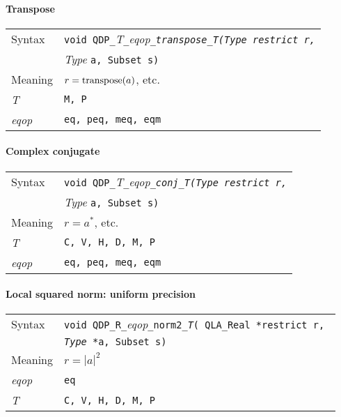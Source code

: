 \documentclass{article}
\newcommand{\tqlaReal}{QLA\ttdash Real }
\newcommand{\namespace}{QDP}
\newcommand{\allEqOps}{{\tt eq, peq, meq, eqm}}
\newcommand{\allComplexTypes}{{\tt C, V, H, D, M, P}}
\newcommand{\ttdash}{{\tt \_}}
\newcommand{\itt}{\it T}
\newcommand{\extraarg}{, Subset s}
\newcommand{\protoUnarySingleTypesQual}[5]{{\tt void \namespace}\ttdash{\tt #1}\ttdash{\it eqop}\ttdash#2\ttdash{\tt #3}{\tt ( #4 *restrict r, }\\
  & {\tt #5 *a\extraarg)}}
\newcommand{\protoUnaryQual}[1]{{\tt void \namespace}\ttdash\itt\ttdash{\it eqop}\ttdash#1\ttdash\itt{\tt (}{\it Type }{\tt *restrict r,}\\
 & {\it Type }{\tt *a\extraarg)}}
\begin{document}
\paragraph{Transpose}

\begin{flushleft}
  \begin{tabular}{|l|l|}
  \hline
  Syntax      & \protoUnaryQual{\tt transpose}  \\
  \hline
  Meaning     & $r = {\rm transpose}(a)$, etc. \\
  \hline
  \itt     & {\tt M, P} \\
  \hline
  {\it eqop}  & \allEqOps \\
  \hline
  \end{tabular}
\end{flushleft}

\paragraph{Complex conjugate}

\begin{flushleft}
  \begin{tabular}{|l|l|}
  \hline
  Syntax      & \protoUnaryQual{\tt conj}  \\
  \hline
  Meaning     & $r = a^*$, etc. \\
  \hline
  \itt     & {\tt C, V, H, D, M, P} \\
  \hline
  {\it eqop}  & \allEqOps \\
  \hline
  \end{tabular}
\end{flushleft}

\paragraph{Local squared norm: uniform precision}

\begin{flushleft}
  \begin{tabular}{|l|l|}
  \hline
  Syntax      & \protoUnarySingleTypesQual{R}{\tt norm2}{\itt}{\tqlaReal}{{\it Type}} \\
  \hline
  Meaning     & $r = |a|^2$ \\
  \hline
  {\it eqop}  & {\tt eq} \\
  \hline
  \itt        & \allComplexTypes \\
  \hline
  \end{tabular}
\end{flushleft}
\end{document}
